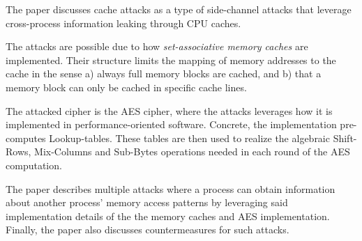 The paper discusses cache attacks as a type of side-channel attacks that leverage cross-process information leaking through CPU caches.

The attacks are possible due to how \textit{set-associative memory caches} are implemented.
Their structure limits the mapping of memory addresses to the cache in the sense a) always full memory blocks are cached, and b) that a memory block can only be cached in specific cache lines.

The attacked cipher is the AES cipher, where the attacks leverages how it is implemented in performance-oriented software.
Concrete, the implementation pre-computes Lookup-tables. These tables are then used to realize the algebraic Shift-Rows, Mix-Columns and Sub-Bytes operations needed in each round of the AES computation.

The paper describes multiple attacks where a process can obtain information about another process' memory access patterns by leveraging said implementation details of the the memory caches and AES implementation.
Finally, the paper also discusses countermeasures for such attacks.




